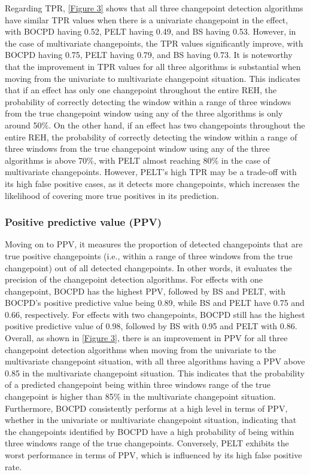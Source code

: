 \documentclass[]{interact}
\theoremstyle{plain}%
\theoremstyle{definition}
\theoremstyle{remark}
\begin{document}
{	\hspace{0.28cm} Regarding TPR, \autoref{Figure 3} shows that all three changepoint detection algorithms have similar TPR values when there is a univariate changepoint in the effect, with BOCPD having 0.52, PELT having 0.49, and BS having 0.53. However, in the case of multivariate changepoints, the TPR values significantly improve, with BOCPD having 0.75, PELT having 0.79, and BS having 0.73. It is noteworthy that the improvement in TPR values for all three algorithms is substantial when moving from the univariate to multivariate changepoint situation. This indicates that if an effect has only one changepoint throughout the entire REH, the probability of correctly detecting the window within a range of three windows from the true changepoint window using any of the three algorithms is only around 50\%. On the other hand, if an effect has two changepoints throughout the entire REH, the probability of correctly detecting the window within a range of three windows from the true changepoint window using any of the three algorithms is above 70\%, with PELT almost reaching 80\% in the case of multivariate changepoints. However, PELT's high TPR may be a trade-off with its high false positive cases, as it detects more changepoints, which increases the likelihood of covering more true positives in its prediction.

    \subsubsection{Positive predictive value (PPV)}
    
    \hspace{0.28cm} Moving on to PPV, it measures the proportion of detected changepoints that are true positive changepoints (i.e., within a range of three windows from the true changepoint) out of all detected changepoints. In other words, it evaluates the precision of the changepoint detection algorithms. For effects with one changepoint, BOCPD has the highest PPV, followed by BS and PELT, with BOCPD's positive predictive value being 0.89, while BS and PELT have 0.75 and 0.66, respectively. For effects with two changepoints, BOCPD still has the highest positive predictive value of 0.98, followed by BS with 0.95 and PELT with 0.86. \\
    
    Overall, as shown in \autoref{Figure 3}, there is an improvement in PPV for all three changepoint detection algorithms when moving from the univariate to the multivariate changepoint situation, with all three algorithms having a PPV above 0.85 in the multivariate changepoint situation. This indicates that the probability of a predicted changepoint being within three windows range of the true changepoint is higher than 85\% in the multivariate changepoint situation. Furthermore, BOCPD consistently performs at a high level in terms of PPV, whether in the univariate or multivariate changepoint situation, indicating that the changepoints identified by BOCPD have a high probability of being within three windows range of the true changepoints. Conversely, PELT exhibits the worst performance in terms of PPV, which is influenced by its high false positive rate.
	
}
\end{document}
